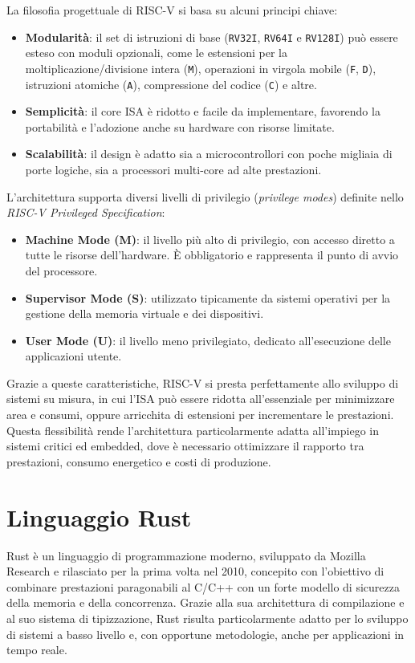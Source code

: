 \documentclass[italian, Lau, oneside]{sapthesis} %
\begin{document}
La filosofia progettuale di RISC-V si basa su alcuni principi chiave:
\begin{itemize}
    \item \textbf{Modularità}: il set di istruzioni di base (\texttt{RV32I}, \texttt{RV64I} e \texttt{RV128I}) può essere esteso con moduli opzionali, come le estensioni per la moltiplicazione/divisione intera (\texttt{M}), operazioni in virgola mobile (\texttt{F}, \texttt{D}), istruzioni atomiche (\texttt{A}), compressione del codice (\texttt{C}) e altre.
    \item \textbf{Semplicità}: il core ISA è ridotto e facile da implementare, favorendo la portabilità e l’adozione anche su hardware con risorse limitate.
    \item \textbf{Scalabilità}: il design è adatto sia a microcontrollori con poche migliaia di porte logiche, sia a processori multi-core ad alte prestazioni.
\end{itemize}

L’architettura supporta diversi livelli di privilegio (\textit{privilege modes}) definite nello \textit{RISC-V Privileged Specification}:
\begin{itemize}
    \item \textbf{Machine Mode (M)}: il livello più alto di privilegio, con accesso diretto a tutte le risorse dell’hardware. È obbligatorio e rappresenta il punto di avvio del processore.
    \item \textbf{Supervisor Mode (S)}: utilizzato tipicamente da sistemi operativi per la gestione della memoria virtuale e dei dispositivi.
    \item \textbf{User Mode (U)}: il livello meno privilegiato, dedicato all’esecuzione delle applicazioni utente.
\end{itemize}

Grazie a queste caratteristiche, RISC-V si presta perfettamente allo sviluppo di sistemi su misura, in cui l’ISA può essere ridotta all’essenziale per minimizzare area e consumi, oppure arricchita di estensioni per incrementare le prestazioni.
Questa flessibilità rende l’architettura particolarmente adatta all’impiego in sistemi critici ed embedded, dove è necessario ottimizzare il rapporto tra prestazioni, consumo energetico e costi di produzione.

\section{Linguaggio Rust}

Rust è un linguaggio di programmazione moderno, sviluppato da Mozilla Research e rilasciato per la prima volta nel 2010, concepito con l’obiettivo di combinare prestazioni paragonabili al C/C++ con un forte modello di sicurezza della memoria e della concorrenza. Grazie alla sua architettura di compilazione e al suo sistema di tipizzazione, Rust risulta particolarmente adatto per lo sviluppo di sistemi a basso livello e, con opportune metodologie, anche per applicazioni in tempo reale.
\end{document}
